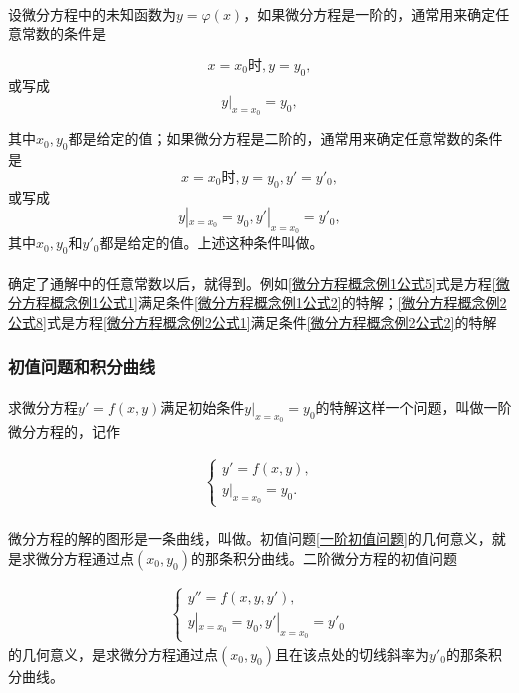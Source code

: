\paragraph{}
设微分方程中的未知函数为$y=\varphi(x)$，如果微分方程是一阶的，通常用来确定任意常数的条件是

\begin{equation}
  x = x_0 \text{时}, y = y_0,
\end{equation}
或写成
\begin{equation}
  y|_{x=x_0} = y_0,
\end{equation}

其中$x_0, y_0$都是给定的值；如果微分方程是二阶的，通常用来确定任意常数的条件是
\begin{equation}
  x=x_0 \text{时}, y=y_0, y'=y'_0,
\end{equation}
或写成
\begin{equation}
  y|_{x=x_0} = y_0, y'|_{x=x_0} = y'_0,
\end{equation}
其中$x_0, y_0$和$y'_0$都是给定的值。上述这种条件叫做。

\paragraph{}
确定了通解中的任意常数以后，就得到。例如\eqref{微分方程概念例1公式5}式是方程\eqref{微分方程概念例1公式1}满足条件\eqref{微分方程概念例1公式2}的特解；\eqref{微分方程概念例2公式8}式是方程\eqref{微分方程概念例2公式1}满足条件\eqref{微分方程概念例2公式2}的特解

\subsubsection{初值问题和积分曲线}
\paragraph{}
求微分方程$y'=f(x,y)$满足初始条件$y|_{x=x_0}=y_0$的特解这样一个问题，叫做一阶微分方程的，记作

\begin{align}
  \label{一阶初值问题}
  \left\{\begin{array}{l}
    y'=f(x,y), \\
    y|_{x=x_0} = y_0.
  \end{array} \right.
\end{align}

\paragraph{}
微分方程的解的图形是一条曲线，叫做。初值问题\eqref{一阶初值问题}的几何意义，就是求微分方程通过点$(x_0,y_0)$的那条积分曲线。二阶微分方程的初值问题

\begin{align}
  \label{二阶初值问题}
  \left\{\begin{array}{l}
    y''=f(x,y,y'), \\
    y|_{x=x_0} = y_0, y'|_{x=x_0} = y'_0
  \end{array} \right.
\end{align}
的几何意义，是求微分方程通过点$(x_0,y_0)$且在该点处的切线斜率为$y'_0$的那条积分曲线。
